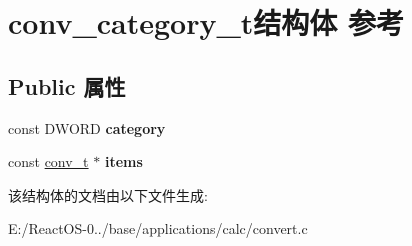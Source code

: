 \hypertarget{structconv__category__t}{}\section{conv\+\_\+category\+\_\+t结构体 参考}
\label{structconv__category__t}
\subsection*{Public 属性}
\begin{DoxyCompactItemize}
\item 
\mbox{\label{structconv__category__t_aaa6a21295377e72bdb03e96f13eb8660}} 
const D\+W\+O\+RD {\bfseries category}
\item 
\mbox{\label{structconv__category__t_a73143a701f44c48d8f6320e1ba1fd3df}} 
const \hyperlink{structconv__t}{conv\+\_\+t} $\ast$ {\bfseries items}
\end{DoxyCompactItemize}


该结构体的文档由以下文件生成\+:\begin{DoxyCompactItemize}
\item 
E\+:/\+React\+O\+S-\/0../base/applications/calc/convert.\+c\end{DoxyCompactItemize}
